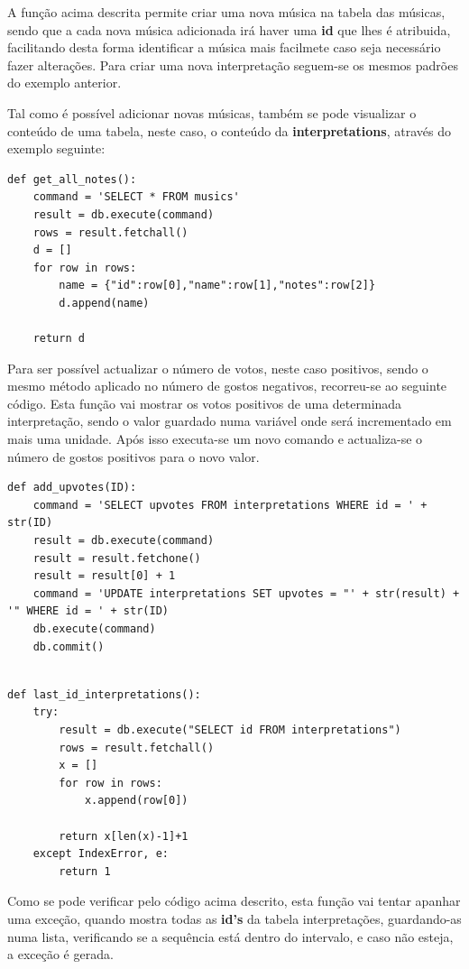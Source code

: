 A função acima descrita permite criar uma nova música na tabela das músicas, sendo que a cada nova música adicionada irá haver uma \textbf{id} que lhes é atribuida, facilitando desta forma identificar a música mais facilmete caso seja necessário fazer alterações. Para criar uma nova interpretação seguem-se os mesmos padrões do exemplo anterior.

Tal como é possível adicionar novas músicas, também se pode visualizar o conteúdo de uma tabela, neste caso, o conteúdo da \textbf{interpretations}, através do exemplo seguinte:

\vspace{5mm}
\begin{lstlisting}
def get_all_notes():
	command = 'SELECT * FROM musics'
	result = db.execute(command)
	rows = result.fetchall()
	d = []
	for row in rows:
		name = {"id":row[0],"name":row[1],"notes":row[2]}
		d.append(name)

	return d
\end{lstlisting}
\vspace{5mm}

Para ser possível actualizar o número de votos, neste caso positivos, sendo o mesmo método aplicado no número de gostos negativos, recorreu-se ao seguinte código. Esta função vai mostrar os votos positivos de uma determinada interpretação, sendo o valor guardado numa variável onde será incrementado em mais uma unidade. Após isso executa-se um novo comando e actualiza-se o número de gostos positivos para o novo valor.  

\vspace{5mm}
\begin{lstlisting}
def add_upvotes(ID):
	command = 'SELECT upvotes FROM interpretations WHERE id = ' + str(ID)
	result = db.execute(command)
	result = result.fetchone()
	result = result[0] + 1
	command = 'UPDATE interpretations SET upvotes = "' + str(result) + '" WHERE id = ' + str(ID)
	db.execute(command)
	db.commit()

\end{lstlisting}
\vspace{5mm}


\vspace{5mm}
\begin{lstlisting}

def last_id_interpretations():
	try:
		result = db.execute("SELECT id FROM interpretations")
		rows = result.fetchall()
		x = []
		for row in rows:
			x.append(row[0])

		return x[len(x)-1]+1
	except IndexError, e:
		return 1

\end{lstlisting}

Como se pode verificar pelo código acima descrito, esta função vai tentar apanhar uma exceção, quando mostra todas as \textbf{id's} da tabela interpretações, guardando-as numa lista, verificando se a sequência está dentro do intervalo, e caso não esteja, a exceção é gerada. 
